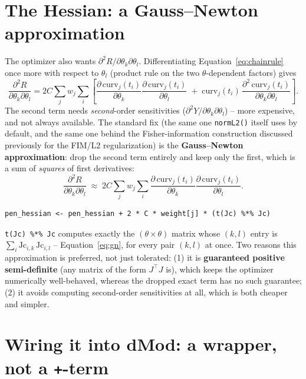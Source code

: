 \documentclass[11pt]{article}
\newcommand{\code}[1]{\texttt{#1}}
\begin{document}
\section{The Hessian: a Gauss--Newton approximation}

The optimizer also wants $\partial^2 R/\partial\theta_k\partial\theta_l$.
Differentiating Equation~\eqref{eq:chainrule} once more with respect to
$\theta_l$ (product rule on the two $\theta$-dependent factors) gives
\[
  \frac{\partial^2 R}{\partial\theta_k\partial\theta_l} =
  2C\sum_j w_j \sum_i \left[
    \frac{\partial\,\mathrm{curv}_j(t_i)}{\partial\theta_k}\frac{\partial\,\mathrm{curv}_j(t_i)}{\partial\theta_l}
    \;+\; \mathrm{curv}_j(t_i)\,\frac{\partial^2\,\mathrm{curv}_j(t_i)}{\partial\theta_k\partial\theta_l}
  \right].
\]
The second term needs \emph{second}-order sensitivities
($\partial^2 Y/\partial\theta_k\partial\theta_l$) -- more expensive, and not
always available. The standard fix (the same one \code{normL2()} itself
uses by default, and the same one behind the Fisher-information
construction discussed previously for the FIM/L2 regularization) is the
\textbf{Gauss--Newton approximation}: drop the second term entirely and
keep only the first, which is a sum of \emph{squares} of first derivatives:
\begin{equation}
  \frac{\partial^2 R}{\partial\theta_k\partial\theta_l} \;\approx\;
  2C\sum_j w_j \sum_i \frac{\partial\,\mathrm{curv}_j(t_i)}{\partial\theta_k}\frac{\partial\,\mathrm{curv}_j(t_i)}{\partial\theta_l}.
  \label{eq:gn}
\end{equation}
\begin{lstlisting}
pen_hessian <- pen_hessian + 2 * C * weight[j] * (t(Jc) %*% Jc)
\end{lstlisting}
\code{t(Jc) \%*\% Jc} computes exactly the $(\theta\times\theta)$ matrix
whose $(k,l)$ entry is $\sum_i \mathrm{Jc}_{i,k}\,\mathrm{Jc}_{i,l}$ --
Equation~\eqref{eq:gn}, for every pair $(k,l)$ at once. Two reasons this
approximation is preferred, not just tolerated: (1) it is
\textbf{guaranteed positive semi-definite} (any matrix of the form
$J^\top J$ is), which keeps the optimizer numerically well-behaved, whereas
the dropped exact term has no such guarantee; (2) it avoids computing
second-order sensitivities at all, which is both cheaper and simpler.

\section{Wiring it into dMod: a wrapper, not a \code{+}-term}
\end{document}
